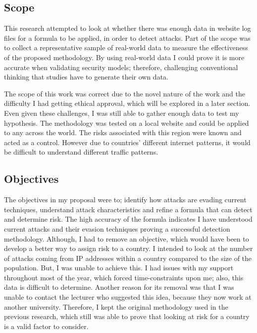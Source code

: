 \subsection{Scope}

This research attempted to look at whether there was enough data in website log files for a formula to be applied, in order to detect attacks. Part of the scope was to collect a representative sample of real-world data to measure the effectiveness of the proposed methodology. By using real-world data I could prove it is more accurate when validating security models; therefore, challenging conventional thinking that studies have to generate their own data.

The scope of this work was correct due to the novel nature of the work and the difficulty I had getting ethical approval, which will be explored in a later section. Even given these challenges, I was still able to gather enough data to test my hypothesis. The methodology was tested on a local website and could be applied to any across the world. The risks associated with this region were known and acted as a control. However due to countries' different internet patterns, it would be difficult to understand different traffic patterns. 


\subsection{Objectives}

The objectives in my proposal were to; identify how attacks are evading current techniques, understand attack characteristics and refine a formula that can detect and determine risk. The high accuracy of the formula indicates I have understood current attacks and their evasion techniques proving a successful detection methodology. Although, I had to remove an objective, which would have been to develop a better way to assign risk to a country. I intended to look at the number of attacks coming from IP addresses within a country compared to the size of the population. But, I was unable to achieve this. I had issues with my support throughout most of the year, which forced time-constraints upon me; also, this data is difficult to determine. Another reason for its removal was that I was unable to contact the lecturer who suggested this idea, because they now work at another university. Therefore, I kept the original methodology used in the previous research, which still was able to prove that looking at risk for a country is a valid factor to consider.

